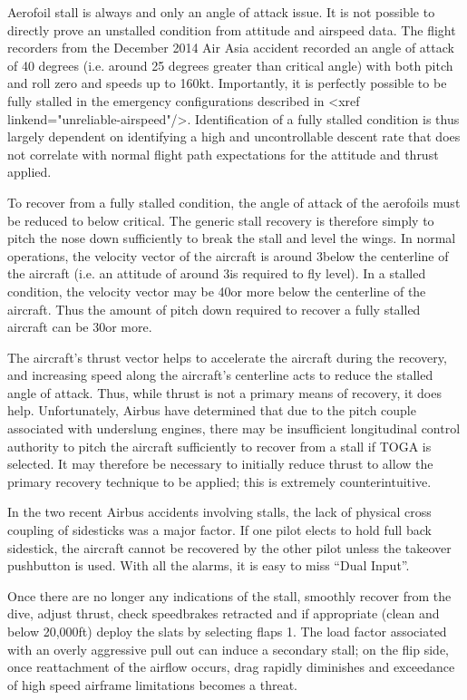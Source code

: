 \documentclass[a5paper,11pt,twoside]{book}
\begin{document}
Aerofoil stall is always and only an angle of attack issue. It is not possible
to directly prove an unstalled condition from attitude and airspeed data. The
flight recorders from the December 2014 Air Asia accident recorded an angle of
attack of 40 degrees (i.e. around 25 degrees greater than critical angle) with
both pitch and roll zero and speeds up to 160kt. Importantly, it is perfectly
possible to be fully stalled in the emergency configurations described in <xref
linkend="unreliable-airspeed"/>. Identification of a fully stalled condition is
thus largely dependent on identifying a high and uncontrollable descent rate
that does not correlate with normal flight path expectations for the attitude
and thrust applied.

To recover from a fully stalled condition, the angle of attack of the aerofoils
must be reduced to below critical. The generic stall recovery is therefore
simply to pitch the nose down sufficiently to break the stall and level the
wings. In normal operations, the velocity vector of the aircraft is around
3\textdegree{ }below the centerline of the aircraft (i.e. an attitude of around
3\textdegree{ }is required to fly level). In a stalled condition, the velocity
vector may be 40\textdegree{ }or more below the centerline of the
aircraft. Thus the amount of pitch down required to recover a fully stalled
aircraft can be 30\textdegree{ }or more.

The aircraft’s thrust vector helps to accelerate the aircraft during the
recovery, and increasing speed along the aircraft’s centerline acts to reduce
the stalled angle of attack. Thus, while thrust is not a primary means of
recovery, it does help. Unfortunately, Airbus have determined that due to the
pitch couple associated with underslung engines, there may be insufficient
longitudinal control authority to pitch the aircraft sufficiently to recover
from a stall if TOGA is selected. It may therefore be necessary to initially
reduce thrust to allow the primary recovery technique to be applied; this is
extremely counterintuitive.

In the two recent Airbus accidents involving stalls, the lack of physical cross
coupling of sidesticks was a major factor. If one pilot elects to hold full back
sidestick, the aircraft cannot be recovered by the other pilot unless the
takeover pushbutton is used. With all the alarms, it is easy to miss “Dual
Input”.

Once there are no longer any indications of the stall, smoothly recover from the
dive, adjust thrust, check speedbrakes retracted and if appropriate (clean and
below 20,000ft) deploy the slats by selecting flaps 1. The load factor
associated with an overly aggressive pull out can induce a secondary stall; on
the flip side, once reattachment of the airflow occurs, drag rapidly diminishes
and exceedance of high speed airframe limitations becomes a threat.
\end{document}
